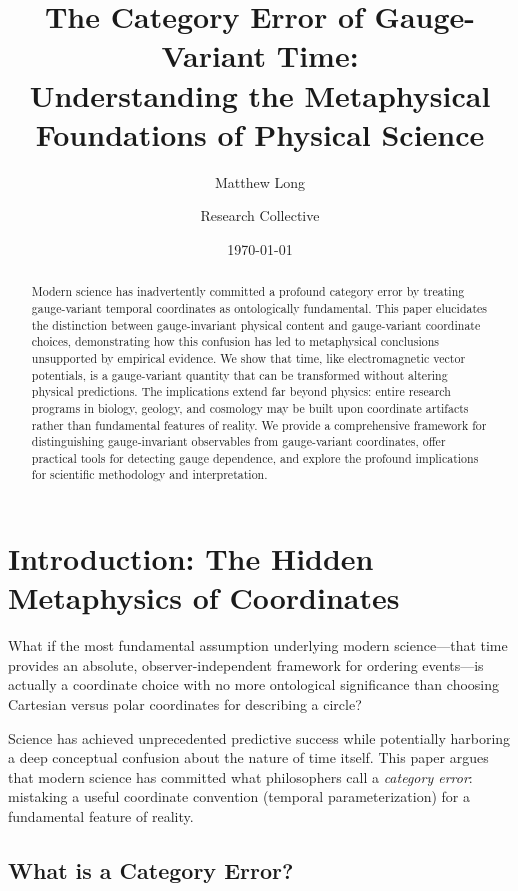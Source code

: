 \documentclass[11pt]{article}
\title{\textbf{The Category Error of Gauge-Variant Time: \\
Understanding the Metaphysical Foundations of Physical Science}}
\author[1]{Matthew Long}
\author[2]{Research Collective}
\affil[1]{Yoneda AI}
\affil[2]{Independent Researchers}
\date{\today}
\theoremstyle{definition}
\theoremstyle{plain}
\theoremstyle{remark}
\begin{document}
\maketitle

\begin{abstract}
Modern science has inadvertently committed a profound category error by treating gauge-variant temporal coordinates as ontologically fundamental. This paper elucidates the distinction between gauge-invariant physical content and gauge-variant coordinate choices, demonstrating how this confusion has led to metaphysical conclusions unsupported by empirical evidence. We show that time, like electromagnetic vector potentials, is a gauge-variant quantity that can be transformed without altering physical predictions. The implications extend far beyond physics: entire research programs in biology, geology, and cosmology may be built upon coordinate artifacts rather than fundamental features of reality. We provide a comprehensive framework for distinguishing gauge-invariant observables from gauge-variant coordinates, offer practical tools for detecting gauge dependence, and explore the profound implications for scientific methodology and interpretation.
\end{abstract}

\section{Introduction: The Hidden Metaphysics of Coordinates}

\begin{keypoint}
What if the most fundamental assumption underlying modern science—that time provides an absolute, observer-independent framework for ordering events—is actually a coordinate choice with no more ontological significance than choosing Cartesian versus polar coordinates for describing a circle?
\end{keypoint}

Science has achieved unprecedented predictive success while potentially harboring a deep conceptual confusion about the nature of time itself. This paper argues that modern science has committed what philosophers call a \emph{category error}: mistaking a useful coordinate convention (temporal parameterization) for a fundamental feature of reality.

\subsection{What is a Category Error?}
\end{document}
